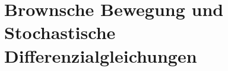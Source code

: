 %
%
%
%

\chapter{Brownsche Bewegung und Stochastische Differenzialgleichungen\label{chapter:brown}}


% 

\begin{refsection}






\printbibliography[heading=subbibliography]

\end{refsection}
